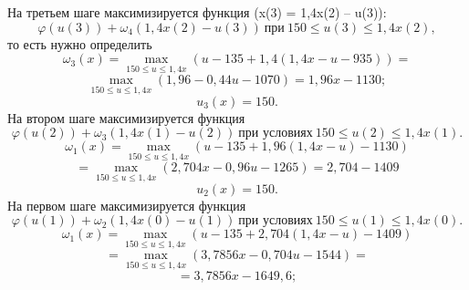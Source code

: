 \indent На третьем шаге максимизируется функция  (x(3) = 1,4x(2) – u(3)):
 \begin{equation*}
\varphi(u(3)) + \omega_4(1,4x(2)-u(3))\:при\:150 \le u(3) \le 1,4x(2),
\end{equation*}
\indent  то есть нужно определить
 \begin{equation*}
\omega_3(x)= \max_{150\le u \le 1,4x}(u-135+1,4(1,4x-u-935))=
\end{equation*}
 \begin{equation*}
\max_{150\le u \le 1,4x}(1,96-0,44u-1070)=1,96x-1130;
\end{equation*}
 \begin{equation*}
u_3(x)=150.
\end{equation*}
\indent На втором шаге максимизируется функция
 \begin{equation*}
\varphi(u(2))+\omega_3(1,4x(1)-u(2)) \:\text{при условиях}\:150\le u(2) \le 1,4x(1).
\end{equation*}
 \begin{equation*}
\omega_1(x) = \max_{150 \le u \le 1,4x}(u-135+1,96(1,4x-u)-1130)
\end{equation*}
 \begin{equation*}
=\max_{150 \le u \le 1,4x}(2,704x-0,96u-1265)=2,704-1409
\end{equation*}
 \begin{equation*}
u_2(x)=150.
\end{equation*}
\indent На первом шаге максимизируется функция
 \begin{equation*}
\varphi(u(1))+\omega_2(1,4x(0)-u(1)) \:\text{при условиях}\:150\le u(1) \le 1,4x(0).
\end{equation*}
 \begin{equation*}
\omega_1(x) = \max_{150 \le u \le 1,4x}(u-135+2,704(1,4x-u)-1409)
\end{equation*}
 \begin{equation*}
=\max_{150 \le u \le 1,4x}(3,7856x-0,704u-1544)=
\end{equation*}
 \begin{equation*}
=3,7856x-1649,6;
\end{equation*}
